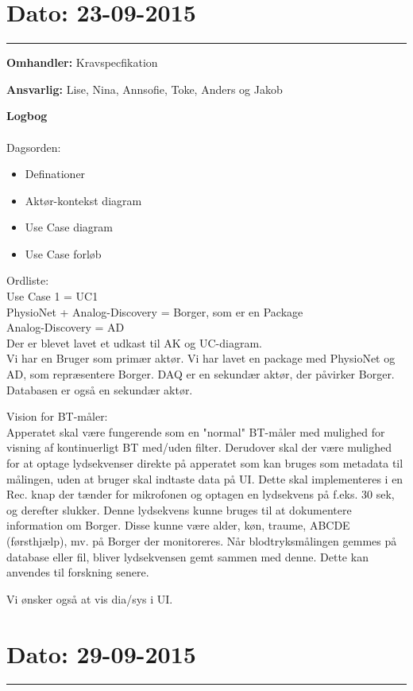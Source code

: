 \section{Dato: 23-09-2015 }
\hrule

\textbf{Omhandler:} Kravspecfikation 

\textbf{Ansvarlig:} Lise, Nina, Annsofie, Toke, Anders og Jakob

\textbf{Logbog}
\\
\\
Dagsorden:
\begin{itemize}
	\item Definationer
	\item Aktør-kontekst diagram
	\item Use Case diagram
	\item Use Case forløb
\end{itemize}

Ordliste:\\ 
Use Case 1 = UC1 \\
PhysioNet + Analog-Discovery = Borger, som er en Package \\
Analog-Discovery = AD \\


Der er blevet lavet et udkast til AK og UC-diagram. \\
Vi har en Bruger som primær aktør. Vi har lavet en package med PhysioNet og AD, som repræsentere Borger. DAQ er en sekundær aktør, der påvirker Borger. Databasen er også en sekundær aktør. 


Vision for BT-måler:\\
Apperatet skal være fungerende som en "normal" BT-måler med mulighed for visning af kontinuerligt BT med/uden filter. Derudover skal der være mulighed for at optage lydsekvenser direkte på apperatet som kan bruges som metadata til målingen, uden at bruger skal indtaste data på UI. Dette skal implementeres i en Rec. knap der tænder for mikrofonen og optagen en lydsekvens på f.eks. 30 sek, og derefter slukker. Denne lydsekvens kunne bruges til at dokumentere information om Borger. Disse kunne være alder, køn, traume, ABCDE (førsthjælp), mv. på Borger der monitoreres. 
Når blodtryksmålingen gemmes på database eller fil, bliver lydsekvensen gemt sammen med denne. Dette kan anvendes til forskning senere. 


Vi ønsker også at vis dia/sys i UI. 


\section{Dato: 29-09-2015 }
\hrule

